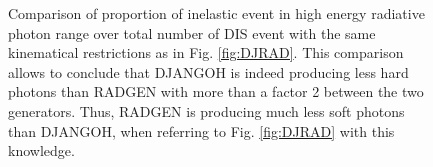 \begin{figure}[htb]
\centerline{}
\caption{Comparison of proportion of inelastic event in high energy radiative photon range over total number
of DIS event with the same kinematical restrictions as in Fig. \ref{fig:DJRAD}. This comparison allows to conclude that DJANGOH is indeed producing less hard photons than
RADGEN with more than a factor 2 between the two generators. Thus, RADGEN is producing much less
soft photons than DJANGOH, when referring to Fig. \ref{fig:DJRAD} with this knowledge.}\label{fig:tabDJRAD}
\end{figure}
